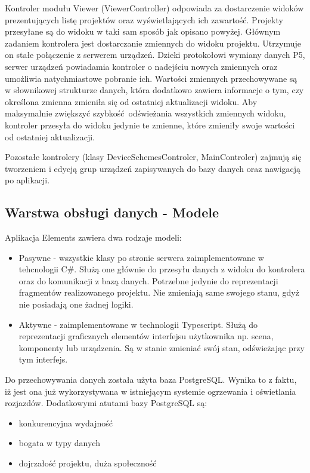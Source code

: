 Kontroler modułu Viewer (ViewerController) odpowiada za dostarczenie widoków prezentujących listę projektów oraz wyświetlających ich zawartość. Projekty przesyłane są do widoku w taki sam sposób jak opisano powyżej. Głównym zadaniem kontrolera jest dostarczanie zmiennych do widoku projektu. Utrzymuje on stałe połączenie z serwerem urządzeń. Dzieki protokołowi wymiany danych P5, serwer urządzeń powiadamia kontroler o nadejściu nowych zmiennych oraz umożliwia natychmiastowe pobranie ich. Wartości zmiennych przechowywane są w słownikowej strukturze danych, która dodatkowo zawiera informacje o tym, czy określona zmienna zmieniła się od ostatniej aktualizacji widoku. Aby maksymalnie zwiększyć szybkość odświeżania wszystkich zmiennych widoku, kontroler przesyła do widoku jedynie te zmienne, które zmieniły swoje wartości od ostatniej aktualizacji.

Pozostałe kontrolery (klasy DeviceSchemesControler, MainControler) zajmują się tworzeniem i edycją grup urządzeń zapisywanych do bazy danych oraz nawigacją po aplikacji.

\subsection{Warstwa obsługi danych - Modele}
Aplikacja Elements zawiera dwa rodzaje modeli:
\begin{itemize}
\item Pasywne - wszystkie klasy po stronie serwera zaimplementowane w tehcnologii C\#. Służą one głównie do przesyłu danych z widoku do kontrolera oraz do komunikacji z bazą danych. Potrzebne jedynie do reprezentacji fragmentów realizowanego projektu. Nie zmieniają same swojego stanu, gdyż nie posiadają one żadnej logiki. 
\item Aktywne - zaimplementowane w technologii Typescript. Służą do reprezentacji graficznych elementów interfejsu użytkownika np. scena, komponenty lub urządzenia. Są w stanie zmieniać swój stan, odświeżając przy tym interfejs.
\end{itemize}

Do przechowywania danych została użyta baza PostgreSQL. Wynika to z faktu, iż jest ona już wykorzystywana w istniejącym systemie ogrzewania i oświetlania rozjazdów. Dodatkowymi atutami bazy PostgreSQL są: \cite{postgresql-book}
\begin{itemize}
\item konkurencyjna wydajność
\item bogata w typy danych
\item dojrzałość projektu, duża społeczność
\end{itemize}

